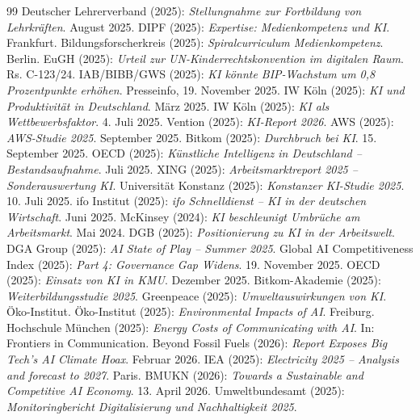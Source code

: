 \documentclass[12pt,a4paper]{article}
\begin{document}
\begin{thebibliography}{99}
		 Deutscher Lehrerverband (2025): \emph{Stellungnahme zur Fortbildung von Lehrkräften}. August 2025.
		 DIPF (2025): \emph{Expertise: Medienkompetenz und KI}. Frankfurt.
		 Bildungsforscherkreis (2025): \emph{Spiralcurriculum Medienkompetenz}. Berlin.
		 EuGH (2025): \emph{Urteil zur UN-Kinderrechtskonvention im digitalen Raum}. Rs. C-123/24.
		 IAB/BIBB/GWS (2025): \emph{KI könnte BIP-Wachstum um 0,8 Prozentpunkte erhöhen}. Presseinfo, 19. November 2025.
		 IW Köln (2025): \emph{KI und Produktivität in Deutschland}. März 2025.
		 IW Köln (2025): \emph{KI als Wettbewerbsfaktor}. 4. Juli 2025.
		 Vention (2025): \emph{KI-Report 2026}.
		 AWS (2025): \emph{AWS-Studie 2025}. September 2025.
		 Bitkom (2025): \emph{Durchbruch bei KI}. 15. September 2025.
		 OECD (2025): \emph{Künstliche Intelligenz in Deutschland – Bestandsaufnahme}. Juli 2025.
		 XING (2025): \emph{Arbeitsmarktreport 2025 – Sonderauswertung KI}.
		 Universität Konstanz (2025): \emph{Konstanzer KI-Studie 2025}. 10. Juli 2025.
		 ifo Institut (2025): \emph{ifo Schnelldienst – KI in der deutschen Wirtschaft}. Juni 2025.
		 McKinsey (2024): \emph{KI beschleunigt Umbrüche am Arbeitsmarkt}. Mai 2024.
		 DGB (2025): \emph{Positionierung zu KI in der Arbeitswelt}.
		 DGA Group (2025): \emph{AI State of Play – Summer 2025}.
		 Global AI Competitiveness Index (2025): \emph{Part 4: Governance Gap Widens}. 19. November 2025.
		 OECD (2025): \emph{Einsatz von KI in KMU}. Dezember 2025.
		 Bitkom-Akademie (2025): \emph{Weiterbildungsstudie 2025}.
		 Greenpeace (2025): \emph{Umweltauswirkungen von KI}. Öko-Institut.
		 Öko-Institut (2025): \emph{Environmental Impacts of AI}. Freiburg.
		 Hochschule München (2025): \emph{Energy Costs of Communicating with AI}. In: Frontiers in Communication.
		 Beyond Fossil Fuels (2026): \emph{Report Exposes Big Tech's AI Climate Hoax}. Februar 2026.
		 IEA (2025): \emph{Electricity 2025 – Analysis and forecast to 2027}. Paris.
		 BMUKN (2026): \emph{Towards a Sustainable and Competitive AI Economy}. 13. April 2026.
		 Umweltbundesamt (2025): \emph{Monitoringbericht Digitalisierung und Nachhaltigkeit 2025}.

\end{thebibliography}
\end{document}
